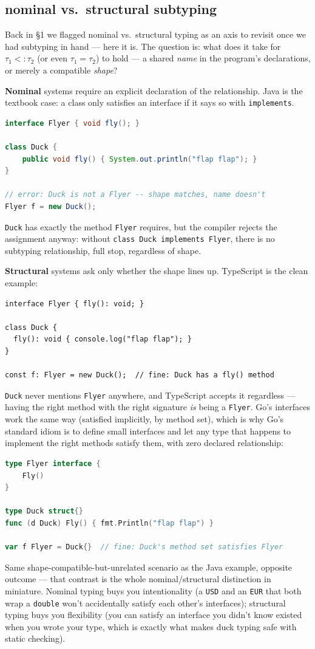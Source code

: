 \subsection{nominal vs.\ structural subtyping}

Back in \S1 we flagged nominal vs.\ structural typing as an axis to revisit once we had subtyping in hand — here it is. The question is: what does it take for $\tau_1 <: \tau_2$ (or even $\tau_1 = \tau_2$) to hold — a shared \emph{name} in the program's declarations, or merely a compatible \emph{shape}?

\textbf{Nominal} systems require an explicit declaration of the relationship. Java is the textbook case: a class only satisfies an interface if it says so with \lstinline|implements|.
\begin{lstlisting}[language=Java]
interface Flyer { void fly(); }

class Duck {
    public void fly() { System.out.println("flap flap"); }
}

// error: Duck is not a Flyer -- shape matches, name doesn't
Flyer f = new Duck();
\end{lstlisting}
\lstinline|Duck| has exactly the method \lstinline|Flyer| requires, but the compiler rejects the assignment anyway: without \lstinline|class Duck implements Flyer|, there is no subtyping relationship, full stop, regardless of shape.

\textbf{Structural} systems ask only whether the shape lines up. TypeScript is the clean example:
\begin{lstlisting}
interface Flyer { fly(): void; }

class Duck {
  fly(): void { console.log("flap flap"); }
}

const f: Flyer = new Duck();  // fine: Duck has a fly() method
\end{lstlisting}
\lstinline|Duck| never mentions \lstinline|Flyer| anywhere, and TypeScript accepts it regardless — having the right method with the right signature \emph{is} being a \lstinline|Flyer|. Go's interfaces work the same way (satisfied implicitly, by method set), which is why Go's standard idiom is to define small interfaces and let any type that happens to implement the right methods satisfy them, with zero declared relationship:
\begin{lstlisting}[language=Go]
type Flyer interface {
    Fly()
}

type Duck struct{}
func (d Duck) Fly() { fmt.Println("flap flap") }

var f Flyer = Duck{}  // fine: Duck's method set satisfies Flyer
\end{lstlisting}
Same shape-compatible-but-unrelated scenario as the Java example, opposite outcome — that contrast is the whole nominal/structural distinction in miniature. Nominal typing buys you intentionality (a \lstinline|USD| and an \lstinline|EUR| that both wrap a \lstinline|double| won't accidentally satisfy each other's interfaces); structural typing buys you flexibility (you can satisfy an interface you didn't know existed when you wrote your type, which is exactly what makes duck typing safe with static checking).

